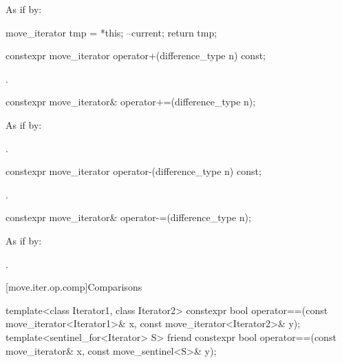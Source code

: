 \begin{itemdescr}
\pnum
\effects
As if by:
\begin{codeblock}
move_iterator tmp = *this;
--current;
return tmp;
\end{codeblock}
\end{itemdescr}

%
\begin{itemdecl}
constexpr move_iterator operator+(difference_type n) const;
\end{itemdecl}

\begin{itemdescr}
\pnum
\returns
{}.
\end{itemdescr}

%
\begin{itemdecl}
constexpr move_iterator& operator+=(difference_type n);
\end{itemdecl}

\begin{itemdescr}
\pnum
\effects
As if by: 

\pnum
\returns
{}.
\end{itemdescr}

%
\begin{itemdecl}
constexpr move_iterator operator-(difference_type n) const;
\end{itemdecl}

\begin{itemdescr}
\pnum
\returns
{}.
\end{itemdescr}

%
\begin{itemdecl}
constexpr move_iterator& operator-=(difference_type n);
\end{itemdecl}

\begin{itemdescr}
\pnum
\effects
As if by: 

\pnum
\returns
{}.
\end{itemdescr}

[move.iter.op.comp]{Comparisons}

%
\begin{itemdecl}
template<class Iterator1, class Iterator2>
  constexpr bool operator==(const move_iterator<Iterator1>& x,
                            const move_iterator<Iterator2>& y);
template<sentinel_for<Iterator> S>
  friend constexpr bool operator==(const move_iterator& x,
                                   const move_sentinel<S>& y);
\end{itemdecl}


